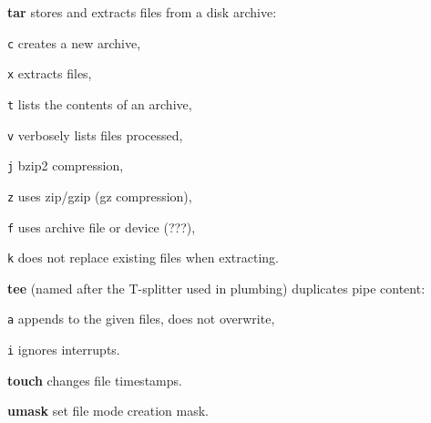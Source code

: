 \begin{enumx}
	\item [\cmd] \textbf{tar} stores and extracts files from a disk archive:
	\item [\texttt{c}] creates a new archive,
	\item [\texttt{x}] extracts files,
	\item [\texttt{t}] lists the contents of an archive,
	\item [\texttt{v}] verbosely lists files processed,
	\item [\texttt{j}] bzip2 compression,
	\item [\texttt{z}] uses zip/gzip (gz compression),
	\item [\texttt{f}] uses archive file or device (???),
	\item [\texttt{k}] does not replace existing files when extracting.
\end{enumx}

\textbf{tee} (named after the T-splitter used in plumbing) duplicates pipe content:
\begin{enumx}
	\item [\texttt{a}] appends to the given files, does not overwrite,
	\item [\texttt{i}] ignores interrupts.
\end{enumx}

\textbf{touch} changes file timestamps.


\textbf{umask} set file mode creation mask.
 